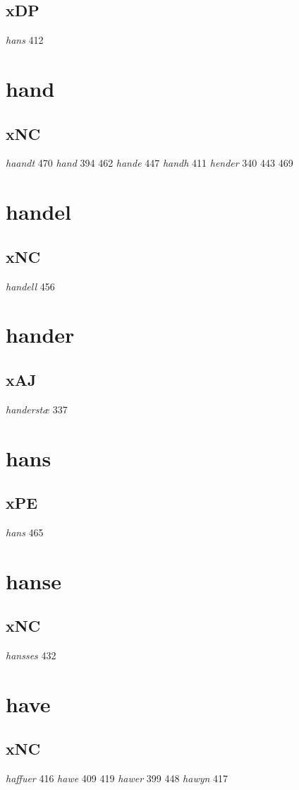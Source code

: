 \documentclass[a4paper,twocolumn]{article}
\begin{document}
\subsection{xDP}
\label{sec:org2389bbd}
\emph{hans} 412 
\section{hand}
\label{sec:org5892046}
\subsection{xNC}
\label{sec:org12b06b5}
\emph{haandt} 470 \emph{hand} 394 462 \emph{hande} 447 \emph{handh} 411 \emph{hender} 340 443 469 
\section{handel}
\label{sec:org52e0c92}
\subsection{xNC}
\label{sec:org4b88e15}
\emph{handell} 456 
\section{hander}
\label{sec:orga31803e}
\subsection{xAJ}
\label{sec:orgeeb4f87}
\emph{handerstæ} 337 
\section{hans}
\label{sec:orge66da2d}
\subsection{xPE}
\label{sec:org17e3c96}
\emph{hans} 465 
\section{hanse}
\label{sec:org2dd2a10}
\subsection{xNC}
\label{sec:org0d8a02b}
\emph{hansses} 432 
\section{have}
\label{sec:org185a6c8}
\subsection{xNC}
\label{sec:orga44a504}
\emph{haffuer} 416 \emph{hawe} 409 419 \emph{hawer} 399 448 \emph{hawyn} 417 
\end{document}
